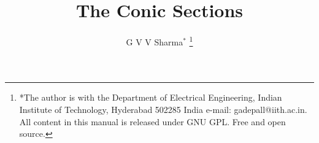 \documentclass[journal,12pt,twocolumn]{IEEEtran}
\renewcommand\thesection{\arabic{section}}
\begin{document}
\let\StandardTheFigure\thefigure
\renewcommand{\thefigure}{\thesection}



\makeatletter
{}
\makeatother

\let\StandardTheFigure\thefigure
\let\StandardTheTable\thetable
\let\vec\mathbf





\def\putbox#1#2#3{\makebox[0in][l]{\makebox[#1][l]{}\raisebox{\baselineskip}[0in][0in]{\raisebox{#2}[0in][0in]{#3}}}}
     \def\rightbox#1{\makebox[0in][r]{#1}}
     \def\centbox#1{\makebox[0in]{#1}}
     \def\topbox#1{\raisebox{-\baselineskip}[0in][0in]{#1}}
     \def\midbox#1{\raisebox{-0.5\baselineskip}[0in][0in]{#1}}

\vspace{3cm}

\title{ 
The Conic Sections
}

\author{ G V V Sharma$^{*}$%
	\thanks{*The author is with the Department
		of Electrical Engineering, Indian Institute of Technology, Hyderabad
		502285 India e-mail:  gadepall@iith.ac.in. All content in this manual is released under GNU GPL.  Free and open source.}
	
}	

\maketitle


\bigskip

\renewcommand{\thefigure}{\theenumi}
\renewcommand{\thetable}{\theenumi}
\end{document}
